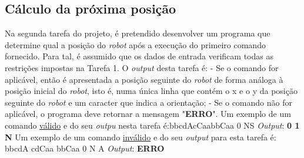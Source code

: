 \documentclass[12pt,a4paper]{article}
\begin{document}
\subsection{Cálculo da próxima posi\c{c}ão}
\textsf { \indent Na segunda tarefa do projeto, é pretendido desenvolver um programa que determine qual a posição do \textit{robot} após a execu\c{c}ão do primeiro comando fornecido. Para tal, é assumido que os dados de entrada verificam todas as restrições impostas na Tarefa 1. \newline \indent O \textit{output} desta tarefa é:
\newline \indent- Se o comando for aplicável, então é apresentada a posição seguinte do \textit{robot} de forma análoga à posi\c{c}ão inicial do \textit{robot}, isto é, numa única linha que contém o x e o y da posição seguinte do \textit{robot} e um caracter que indica a orientação; \newline \indent - Se o comando não for aplicável, o programa deve retornar a mensagem "\textbf{ERRO}".}
\newline \textsf{\indent Um exemplo de um comando \underline{válido} e do seu \textit{outpu} nesta tarefa é:\newline \indent \indent bbcdA\newline\indent\indent cCaa\newline\indent\indent bbCaa\newline\indent{} 0 N\newline\indent\indent S \newline \indent \indent \textit{Output}: \textbf{0 1 N}
\newline \indent Um exemplo de um comando \underline{inválido} e do seu \textit{output} para esta tarefa é: \newline\indent\indent bbcdA \newline\indent\indent cdCaa \newline\indent\indent bbCaa \newline\indent{} 0 N \newline\indent\indent A \newline \indent \indent \textit{Output}: \textbf{ERRO}}
\end{document}
